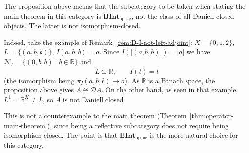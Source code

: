 \begin{remark}\label{rem:op-ae-not-replete}
  The proposition above means that the subcategory to be taken when stating the
  main theorem in this category is
  $\mathbf{BInt}_{\mathrm{op},\mathrm{ae}}$, not the class of all Daniell closed
  objects.
  The latter is not isomorphism-closed.

  Indeed, take the example of
  Remark~\ref{rem:D-I-not-left-adjoint}: $X=\{0,1,2\}$,
  $L=\{(a,b,b)\}$, $I(a,b,b)=a$.
  Since $I(|(a,b,b)|)=|a|$ we have
  $\mathcal{N}_I=\{(0,b,b)\mid b\in\mathbb{R}\}$ and
  \[
    \widetilde{L}\cong\mathbb{R},
    \qquad
    \widetilde{I}(t)=t
  \]
  (the isomorphism being $\pi_I(a,b,b)\mapsto a$).
  As $\mathbb{R}$ is a Banach space, the proposition above gives
  $A\cong\mathcal{D}A$.
  On the other hand, as seen in that example, $L^1=\mathbb{R}^X\ne L$, so $A$ is
  not Daniell closed.

  This is not a counterexample to the main theorem
  (Theorem~\ref{thm:operator-main-theorem}), since being a reflective
  subcategory does not require being isomorphism-closed.
  The point is that $\mathbf{BInt}_{\mathrm{op},\mathrm{ae}}$ is the more
  natural choice for this category.
\end{remark}

